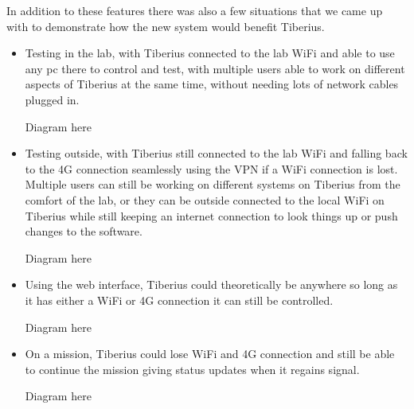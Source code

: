 In addition to these features there was also a few situations that we came up with to demonstrate how the new system would benefit Tiberius.

\begin{itemize}

\item Testing in the lab, with Tiberius connected to the lab WiFi and able to use any pc there to control and test, with multiple users able to work on different aspects of Tiberius at the same time, without needing lots of network cables plugged in.

Diagram here


\item Testing outside, with Tiberius still connected to the lab WiFi and falling back to the 4G connection seamlessly using the VPN if a WiFi connection is lost. Multiple users can still be working on different systems on Tiberius from the comfort of the lab, or they can be outside connected to the local WiFi on Tiberius while still keeping an internet connection to look things up or push changes to the software.

Diagram here

\item Using the web interface, Tiberius could theoretically be anywhere so long as it has either a WiFi or 4G connection it can still be controlled.

Diagram here

\item On a mission, Tiberius could lose WiFi and 4G connection and still be able to continue the mission giving status updates when it regains signal.

Diagram here

\end{itemize}



